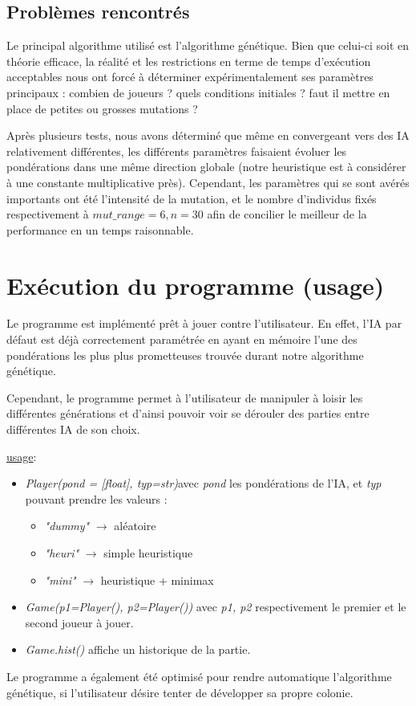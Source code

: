 \documentclass[10pt, french]{article}
\begin{document}
\subsection{Problèmes rencontrés}
Le principal algorithme utilisé est l'algorithme génétique. Bien que celui-ci soit en théorie efficace, la réalité et les restrictions en terme de temps d'exécution acceptables nous ont forcé à déterminer expérimentalement ses paramètres principaux : combien de joueurs ? quels conditions initiales ? faut il mettre en place de petites ou grosses mutations ?
\par Après plusieurs tests, nous avons déterminé que même en convergeant vers des IA relativement différentes, les différents paramètres faisaient évoluer les pondérations dans une même direction globale (notre heuristique est à considérer à une constante multiplicative près). Cependant, les paramètres qui se sont avérés importants ont été l'intensité de la mutation, et le nombre d'individus fixés respectivement à $mut\_range =6, n=30$ afin de concilier le meilleur de la performance en un temps raisonnable.
\section{Exécution du programme (usage)}
Le programme est implémenté prêt à jouer contre l'utilisateur. En effet, l'IA par défaut est déjà correctement paramétrée en ayant en mémoire l'une des pondérations les plus plus prometteuses trouvée durant notre algorithme génétique.
\par Cependant, le programme permet à l'utilisateur de manipuler à loisir les différentes générations et d'ainsi pouvoir voir se dérouler des parties entre différentes IA de son choix.
\par \underline{usage}:
\begin{itemize}
\item \textit{Player(pond = [float], typ=str)}\quad avec \emph{pond} les pondérations de l'IA, et \emph{typ} pouvant prendre les valeurs :
\begin{itemize}\item \emph{"dummy"} $\rightarrow$ aléatoire
\item \emph{"heuri"} $\rightarrow$ simple heuristique
\item \emph{"mini"} $\rightarrow$ heuristique + minimax
\end{itemize}
\item \textit{Game(p1=Player(), p2=Player())} \quad avec \emph{p1, p2} respectivement le premier et le second joueur à jouer.
\item \textit{Game.hist()} \quad affiche un historique de la partie.
\end{itemize}
Le programme a également été optimisé pour rendre automatique l'algorithme génétique, si l'utilisateur désire tenter de développer sa propre colonie.
\end{document}
